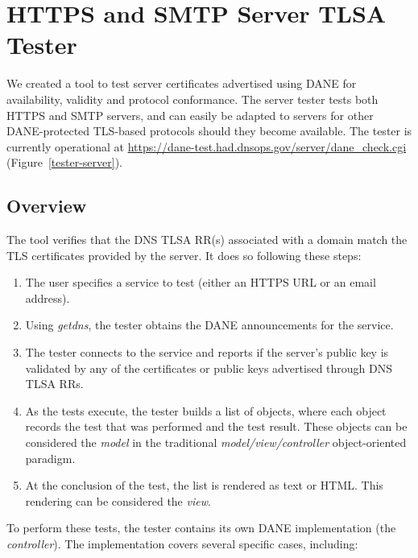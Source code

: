 \documentclass[preprint,3p,11pt]{elsarticle}
\begin{document}
\section{HTTPS and SMTP Server TLSA Tester}
We created a tool to test server certificates advertised using DANE
for availability, validity and protocol conformance. The server tester
tests both HTTPS and SMTP servers, and can easily be adapted to servers
for other DANE-protected TLS-based protocols should they become available. The tester
is currently operational at
\url{https://dane-test.had.dnsops.gov/server/dane_check.cgi} (Figure~\ref{tester-server}).


\subsection{Overview}

The tool verifies that the DNS TLSA RR(s) associated with a domain
match the TLS certificates provided by the server. It does so following these steps: 

\begin{enumerate}
\item The user specifies a service to test (either an HTTPS URL or an
  email address).
\item Using \emph{getdns}, the tester obtains the DANE announcements for the
  service. 
\item The tester connects to the service and reports if the server's
  public key is validated by any of the   certificates or public keys
  advertised through DNS TLSA RRs. 
\item As the tests execute, the tester builds a list of objects, where
  each object records the test that was performed and the test
  result. These objects can be considered the \emph{model} in the
  traditional \emph{model/view/controller} object-oriented paradigm.
\item At the conclusion of the test, the list is rendered as text or
  HTML. This rendering can be considered the \emph{view}.
\end{enumerate}

To perform these tests, the tester contains its own DANE
implementation (the \emph{controller}). The implementation covers several specific cases,
including:
\end{document}
